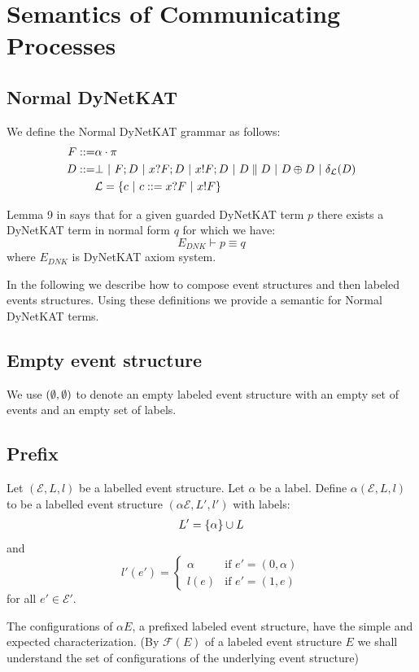 \section{Semantics of Communicating Processes}
\subsection{Normal DyNetKAT}
We define the Normal DyNetKAT grammar as follows:
\begin{align*}
    F ::= & \alpha\cdot\pi                                                                           \\
    D ::= & \bot ~|~ F;D ~|~ x?F;D ~|~ x!F;D ~|~ D \parallel D ~|~ D \oplus D ~|~ \delta_{\mathcal{L}}(D) \\
          & \mathcal{L} = \{c ~|~ c ::= x?F ~|~ x!F\}
\end{align*}

Lemma 9 in \cite{dynetkat} says that for a given guarded DyNetKAT term
$p$ there exists a DyNetKAT term in normal form $q$ for which we have:
\begin{equation*}
    E_{DNK} \vdash p \equiv q
\end{equation*}
where $E_{DNK}$ is DyNetKAT axiom system.

In the following we describe how to compose event structures and
then labeled events structures.
Using these definitions we provide a semantic for Normal DyNetKAT
terms.

\subsection{Empty event structure}
We use $(\emptyset,\emptyset)$ to denote an empty labeled event structure with
an empty set of events and an empty set of labels.

\subsection{Prefix}

\begin{definition}
    Let $(\mathcal{E},L,l)$ be a labelled event structure.
    Let $\alpha$ be a label.
    Define $\alpha(\mathcal{E},L,l)$ to be a labelled event structure $(\alpha \mathcal{E},L',l')$
    with labels:
    \begin{align*}
        L' = \{\alpha\} \cup L
    \end{align*}
    and
    $$
        l'(e') = \begin{cases}
            \alpha & \text{if } e' = (0,\alpha) \\
            l(e)   & \text{if } e' = (1,e)
        \end{cases}
    $$
    for all $e' \in \mathcal{E'}$.
\end{definition}
The configurations of $\alpha E$, a prefixed labeled event structure,
have the simple and expected characterization.
(By $\mathcal{F}(E)$ of a labeled event structure $E$ we shall understand the set
of configurations of the underlying event structure)

